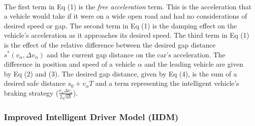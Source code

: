 \documentclass[12pt]{article}
\begin{document}
\paragraph{}
The first term in Eq (1) is the \textit{free acceleration} term. This is the acceleration that a vehicle would take if it were on a wide open road and had no considerations of desired speed or gap.  The second term in Eq (1) is the damping effect on the vehicle's acceleration as it approaches its desired speed.  The third term in Eq (1) is the effect of the relative difference between the desired gap distance $s^*(v_\alpha,\Delta v_\alpha)$ and the current gap distance on the car's acceleration. The difference in position and speed of a vehicle $\alpha$ and the leading vehicle are given by Eq (2) and (3).  The desired gap distance, given by Eq (4), is the sum of a desired safe distance $s_0+v_\alpha T$ and a term representing the intelligent vehicle's braking strategy \cite{intelligent_driver_model} ($\frac{v_\alpha \Delta v_\alpha}{2 \sqrt{ab}}$).
\subsubsection{Improved Intelligent Driver Model (IIDM)}
\end{document}
